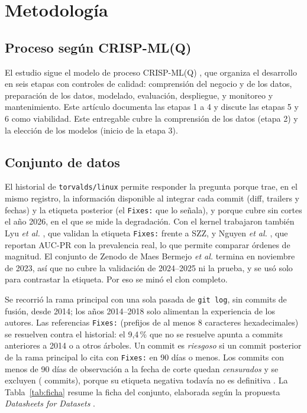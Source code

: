 \section{Metodología}

\subsection{Proceso según CRISP-ML(Q)}
El estudio sigue el modelo de proceso CRISP-ML(Q) \cite{Studer2021}, que organiza el desarrollo en seis etapas con controles de calidad: comprensión del negocio y de los datos, preparación de los datos, modelado, evaluación, despliegue, y monitoreo y mantenimiento. Este artículo documenta las etapas 1 a 4 y discute las etapas 5 y 6 como viabilidad. Este entregable cubre la comprensión de los datos (etapa 2) y la elección de los modelos (inicio de la etapa 3).

\subsection{Conjunto de datos}
El historial de \texttt{torvalds/linux} permite responder la pregunta porque trae, en el mismo registro, la información disponible al integrar cada commit (diff, trailers y fechas) y la etiqueta posterior (el \texttt{Fixes:} que lo señala), y porque cubre sin cortes el año 2026, en el que se mide la degradación. Con el kernel trabajaron también Lyu \emph{et al.} \cite{Lyu2024}, que validan la etiqueta \texttt{Fixes:} frente a SZZ, y Nguyen \emph{et al.} \cite{Nguyen2025}, que reportan AUC-PR con la prevalencia real, lo que permite comparar órdenes de magnitud. El conjunto de Zenodo de Maes Bermejo \emph{et al.} \cite{MaesBermejo2024} termina en noviembre de 2023, así que no cubre la validación de 2024--2025 ni la prueba, y se usó solo para contrastar la etiqueta. Por eso se minó el clon completo.

Se recorrió la rama principal con una sola pasada de \texttt{git log}, sin commits de fusión, desde 2014; los años 2014--2018 solo alimentan la experiencia de los autores. Las referencias \texttt{Fixes:} (prefijos de al menos 8 caracteres hexadecimales) se resuelven contra el historial: el 9,4\,\% que no se resuelve apunta a commits anteriores a 2014 o a otros árboles. Un commit es \emph{riesgoso} si un commit posterior de la rama principal lo cita con \texttt{Fixes:} en 90 días o menos. Los commits con menos de 90 días de observación a la fecha de corte quedan \emph{censurados} y se excluyen (\cifCensurados{} commits), porque su etiqueta negativa todavía no es definitiva \cite{Falessi2022,Cabral2019}. La Tabla~\ref{tab:ficha} resume la ficha del conjunto, elaborada según la propuesta \emph{Datasheets for Datasets} \cite{Gebru2021}.

